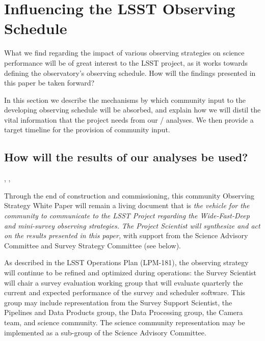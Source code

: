 
\section{Influencing the LSST Observing Schedule}
\label{sec:\secname:schedule}

What we find regarding the impact of various observing strategies on
science performance will be of great interest to the LSST project, as it
works towards defining the observatory's observing schedule. How will
the findings presented in this paper be taken forward?

In this section we describe the mechanisms by which community input to
the developing observing schedule will be absorbed, and explain how
we will distil the vital information that the project needs from our
\OpSim / \MAF analyses. We then provide a target timeline for the provision of community input.


\subsection{How will the results of our analyses be used?}
\label{sec:\secname:useage}

, , 

Through the end of construction and commissioning, this community
Observing Strategy White Paper will remain a living document that is
{\it the vehicle for the community to communicate to the LSST Project
regarding the Wide-Fast-Deep and mini-survey observing strategies.}
{\it The Project Scientist will synthesize and act on the results
presented in this paper,} with support from the Science Advisory
Committee and Survey Strategy Committee (see below).

As described in the LSST Operations Plan (LPM-181), the observing
strategy will continue to be refined and optimized during operations:
the Survey Scientist will chair a survey evaluation working group that
will evaluate quarterly the current and expected performance of the
survey and scheduler software. This group may include representation
from the Survey Support Scientist, the Pipelines and Data Products
group, the Data Processing group, the Camera team, and science
community.  The science community representation may be implemented as a
sub-group of the Science Advisory Committee.

